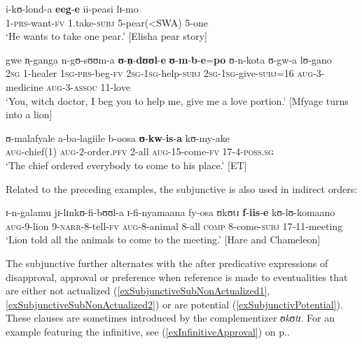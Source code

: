 \begin{exe}
\ex \label{exSubjunctiveModalitySameSubject}
\gll i-kʊ-lond-a \textbf{eeg}-\textbf{e} ii-peasi lɪ-mo\\
1-\textsc{prs}-want-\textsc{fv} 1.take-\textsc{subj} 5-pear(<SWA) 5-one\\
\glt \lq He wants to take one pear.' [Elisha pear story]


\ex \label{exSubjunctiveModalityDifferentSubject}
\gll gwe n̩-ganga n-gʊ-sʊʊm-a \textbf{ʊ}-\textbf{n̩}-\textbf{dʊʊl}-\textbf{e} \textbf{ʊ}-\textbf{m}-\textbf{b}-\textbf{e}=\textbf{po} ʊ-n-kota ʊ-gw-a lʊ-gano\\
\textsc{2sg} 1-healer \textsc{1sg}-\textsc{prs}-beg-\textsc{fv} \textsc{2sg}-\textsc{1sg}-help-\textsc{subj} \textsc{2sg}-\textsc{1sg}-give-\textsc{subj}=16 \textsc{aug}-3-medicine \textsc{aug}-3-\textsc{assoc} 11-love\\
\glt \lq You, witch doctor, I beg you to help me, give me a love portion.' [Mfyage turns into a lion] 

\ex \label{exInfinitiveModalityDifferentSubject}
\gll ʊ-malafyale a-ba-lagiile b-oosa \textbf{ʊ}-\textbf{kw}-\textbf{is}-\textbf{a} kʊ-my-ake\\
\textsc{aug}-chief(1) \textsc{aug}-2-order.\textsc{pfv} 2-all \textsc{aug}-15-come-\textsc{fv} 17-4-\textsc{poss.sg}\\
\glt \lq The chief ordered everybody to come to his place.' [ET]
\end{exe}

Related to the preceding examples, the subjunctive is also used in indirect orders:
\begin{exe}
\ex \gll ɪ-n-galamu jɪ-lɪnkʊ-fi-bʊʊl-a ɪ-fi-nyamaana fy-osa ʊkʊtɪ \textbf{f}-\textbf{iis}-\textbf{e} kʊ-lʊ-komaano\\
\textsc{aug}-9-lion 9-\textsc{narr}-8-tell-\textsc{fv} \textsc{aug}-8-animal 8-all \textsc{comp} 8-come-\textsc{subj} 17-11-meeting\\
\glt \lq Lion told all the animals to come to the meeting.' [Hare and Chameleon]
\end{exe}

The subjunctive further alternates with the  after predicative expressions of disapproval, approval or preference when reference is made to eventualities that are either not actualized (\ref{exSubjunctiveSubNonActualized1}, \ref{exSubjunctiveSubNonActualized2}) or are potential (\ref{exSubjunctivPotential}). These clauses are sometimes introduced by the complementizer \textit{ʊkʊtɪ}. For an example featuring the infinitive, see (\ref{exInfinitiveApproval}) on p.\nobreakspace\pageref{exInfinitiveApproval}.
 
